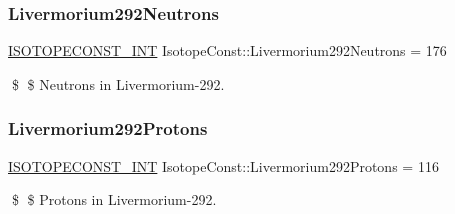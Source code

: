 \subsubsection{\texorpdfstring{Livermorium292\+Neutrons}{Livermorium292Neutrons}}
{\footnotesize\ttfamily \mbox{\hyperlink{group___isotope_const-_macros_ga5f18360b3e99483a35c32d789e62621c}{I\+S\+O\+T\+O\+P\+E\+C\+O\+N\+S\+T\+\_\+\+I\+NT}} Isotope\+Const\+::\+Livermorium292\+Neutrons = 176}

\$ \$ Neutrons in Livermorium-\/292. \mbox{\label{group___isotope_const-_livermorium-_lv292_ga8afe7b9288d938247c0c8bb17333a564}} 
\subsubsection{\texorpdfstring{Livermorium292\+Protons}{Livermorium292Protons}}
{\footnotesize\ttfamily \mbox{\hyperlink{group___isotope_const-_macros_ga5f18360b3e99483a35c32d789e62621c}{I\+S\+O\+T\+O\+P\+E\+C\+O\+N\+S\+T\+\_\+\+I\+NT}} Isotope\+Const\+::\+Livermorium292\+Protons = 116}

\$ \$ Protons in Livermorium-\/292. 